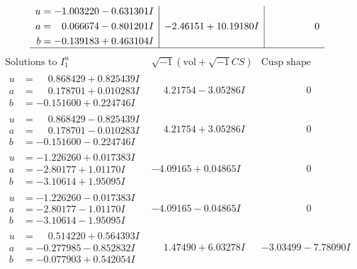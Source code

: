 \documentclass[1p]{elsarticle_modified}
\theoremstyle{definition}
\newcommand{\I}{\sqrt{-1}}
\begin{document}
$$\begin{array}{c|c|c}
\begin{aligned}
u &= -1.003220 - 0.631301 I \\
a &= \phantom{-}0.066674 - 0.801201 I \\
b &= -0.139183 + 0.463104 I\end{aligned}
 & -2.46151 + 10.19180 I & \phantom{-0.000000 } 0\\
 \hline 
 \end{array}$$\newpage$$\begin{array}{c|c|c}  
\text{Solutions to }I^u_{1}& \I (\text{vol} + \sqrt{-1}CS) & \text{Cusp shape}\\
 \hline 
\begin{aligned}
u &= \phantom{-}0.868429 + 0.825439 I \\
a &= \phantom{-}0.178701 + 0.010283 I \\
b &= -0.151600 + 0.224746 I\end{aligned}
 & \phantom{-}4.21754 - 3.05286 I & \phantom{-0.000000 } 0 \\ \hline\begin{aligned}
u &= \phantom{-}0.868429 - 0.825439 I \\
a &= \phantom{-}0.178701 - 0.010283 I \\
b &= -0.151600 - 0.224746 I\end{aligned}
 & \phantom{-}4.21754 + 3.05286 I & \phantom{-0.000000 } 0 \\ \hline\begin{aligned}
u &= -1.226260 + 0.017383 I \\
a &= -2.80177 + 1.01170 I \\
b &= -3.10614 + 1.95095 I\end{aligned}
 & -4.09165 + 0.04865 I & \phantom{-0.000000 } 0 \\ \hline\begin{aligned}
u &= -1.226260 - 0.017383 I \\
a &= -2.80177 - 1.01170 I \\
b &= -3.10614 - 1.95095 I\end{aligned}
 & -4.09165 - 0.04865 I & \phantom{-0.000000 } 0 \\ \hline\begin{aligned}
u &= \phantom{-}0.514220 + 0.564393 I \\
a &= -0.277985 - 0.852832 I \\
b &= -0.077903 + 0.542054 I\end{aligned}
 & \phantom{-}1.47490 + 6.03278 I & -3.03499 - 7.78090 I \\ \hline\begin{aligned}

\end{aligned}
\end{array}$$
\end{document}
